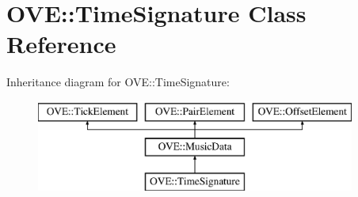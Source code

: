 \hypertarget{class_o_v_e_1_1_time_signature}{}\section{O\+VE\+:\+:Time\+Signature Class Reference}
\label{class_o_v_e_1_1_time_signature}
Inheritance diagram for O\+VE\+:\+:Time\+Signature\+:\begin{figure}[H]
\begin{center}
\leavevmode
\includegraphics[height=3.000000cm]{class_o_v_e_1_1_time_signature}
\end{center}
\end{figure}
